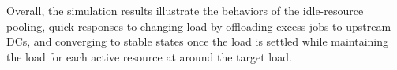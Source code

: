 Overall, the simulation results illustrate the behaviors of the
idle-resource pooling,
quick responses to changing
load by offloading excess jobs to upstream DCs,
and converging to stable states once the load is settled
while maintaining the load for each active resource at around the target
load.

